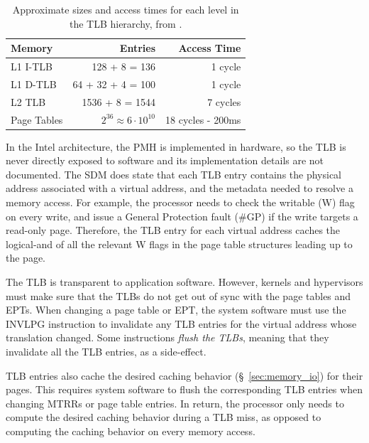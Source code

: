 \begin{table}[hbt]
  \centering
  \begin{tabular}{| l | r | r |}
  \hline
  \textbf{Memory} & \textbf{Entries} & \textbf{Access Time}\\
  \hline
  L1 I-TLB & 128 + 8 = 136 & 1 cycle \\
  \hline
  L1 D-TLB & 64 + 32 + 4 = 100 & 1 cycle \\
  \hline
  L2 TLB & 1536 + 8 = 1544 & 7 cycles \\
  \hline
  Page Tables & $2^{36} \approx 6 \cdot 10^{10} $ & 18 cycles - 200ms \\
  \hline
  \end{tabular}
  \caption{
    Approximate sizes and access times for each level in the TLB hierarchy,
    from \cite{7zip2014haswell}.
  }
  \label{fig:tlb_timings}
\end{table}


In the Intel architecture, the PMH is implemented in hardware, so the TLB is
never directly exposed to software and its implementation details are not
documented.  The SDM does state that each TLB entry contains the physical
address associated with a virtual address, and the metadata needed to resolve a
memory access. For example, the processor needs to check the writable (W) flag
on every write, and issue a General Protection fault (\#GP) if the write
targets a read-only page.  Therefore, the TLB entry for each virtual address
caches the logical-and of all the relevant W flags in the page table structures
leading up to the page.

The TLB is transparent to application software. However, kernels and
hypervisors must make sure that the TLBs do not get out of sync with the page
tables and EPTs. When changing a page table or EPT, the system software must
use the INVLPG instruction to invalidate any TLB entries for the virtual
address whose translation changed. Some instructions \textit{flush the TLBs},
meaning that they invalidate all the TLB entries, as a side-effect.


TLB entries also cache the desired caching behavior (\S~\ref{sec:memory_io})
for their pages. This requires system software to flush the corresponding TLB
entries when changing MTRRs or page table entries. In return, the processor
only needs to compute the desired caching behavior during a TLB miss, as
opposed to computing the caching behavior on every memory access.

